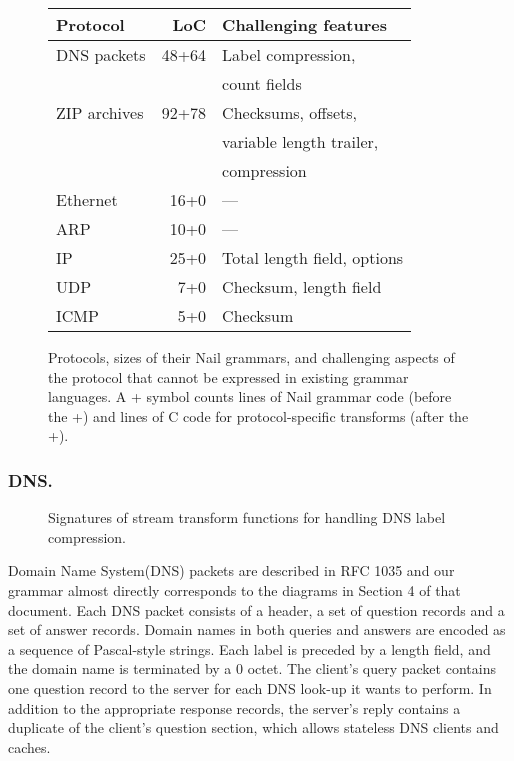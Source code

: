 \begin{figure}[tb]
\centering
\begin{tabular}{lrl}
\toprule
\textbf{Protocol} & \textbf{LoC} & \textbf{Challenging features} \\ 
\midrule
DNS packets & 48+64 & Label compression,\\
  & & count fields \\
ZIP archives & 92+78 & Checksums, offsets, \\ 
  & & variable length trailer, \\
  & & compression \\
Ethernet  & 16+0\phantom{0} & --- \\
ARP       & 10+0\phantom{0} & --- \\
IP        & 25+0\phantom{0} & Total length field, options \\
UDP       &  7+0\phantom{0} & Checksum, length field \\
ICMP      &  5+0\phantom{0} & Checksum \\
\bottomrule
\end{tabular}

\caption{Protocols, sizes of their Nail grammars, and challenging aspects
of the protocol that cannot be expressed in existing grammar languages.
A + symbol counts lines of Nail grammar code (before the +) and lines of
C code for protocol-specific transforms (after the +).}
\label{fig:eval-protocols}
\end{figure}

\subsubsection{DNS.}



\begin{figure}
\smaller[0.5]

\caption{Signatures of stream transform functions for handling DNS label compression.}
\label{fig:dns-xform}
\end{figure}

Domain Name System(DNS) packets are described in RFC 1035 and our grammar almost directly
corresponds to the diagrams in Section 4 of that document. Each DNS packet consists of a header, a
set of question records and a set of answer records. Domain names in both queries and answers are
encoded as a sequence of Pascal-style strings. Each label is preceded by a length field, and the
domain name is terminated by a $0$ octet. The client's query packet contains one question
record to the server for each DNS look-up it wants to perform. In addition to the appropriate
response records, the server's reply contains a duplicate of the client's question section, which
allows stateless DNS clients and caches.

